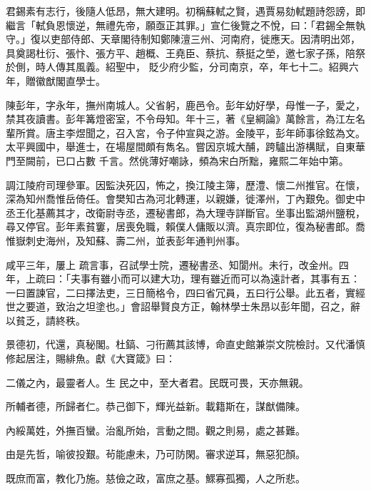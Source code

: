 \begin{pinyinscope}
 君錫素有志行，後隨人低昂，無大建明。初稱蘇軾之賢，遇賈易劾軾題詩怨謗，即繼言「軾負恩懷逆，無禮先帝，願亟正其罪。」宣仁後覽之不悅，曰：「君錫全無執守。」復以吏部侍郎、天章閣待制知鄭陳澶三州、河南府，徙應天。因清明出郊，具奠謁杜衍、張忭、張方平、趙概、王堯臣、蔡抗、蔡挺之塋，邀七家子孫，陪祭於側，時人傳其風義。紹聖中，
 貶少府少監，分司南京，卒，年七十二。紹興六年，贈徽猷閣直學士。



 陳彭年，字永年，撫州南城人。父省躬，鹿邑令。彭年幼好學，母惟一子，愛之，禁其夜讀書。彭年篝燈密室，不令母知。年十三，著《皇綱論》萬餘言，為江左名輩所賞。唐主李煜聞之，召入宮，令子仲宣與之游。金陵平，彭年師事徐鉉為文。太平興國中，舉進士，在場屋間頗有雋名。嘗因京城大酺，跨驢出游構賦，自東華門至闕前，已口占數
 千言。然佻薄好嘲詠，頻為宋白所黜，雍熙二年始中第。



 調江陵府司理參軍。因監決死囚，怖之，換江陵主簿，歷澧、懷二州推官。在懷，深為知州喬惟岳倚任。會樊知古為河北轉運，以親嫌，徙澤州，丁內艱免。御史中丞王化基薦其才，改衛尉寺丞，遷秘書郎，為大理寺詳斷官。坐事出監湖州鹽稅，尋又停官。彭年素貧窶，居喪免職，賴僕人傭販以濟。真宗即位，復為秘書郎。喬惟嶽刺史海州，及知蘇、壽二州，並表彭年通判州事。



 咸平三年，屢上
 疏言事，召試學士院，遷秘書丞、知閬州。未行，改金州。四年，上疏曰：「夫事有雖小而可以建大功，理有雖近而可以為遠計者，其事有五：一曰置諫官，二曰擇法吏，三日簡格令，四曰省冗員，五曰行公舉。此五者，實經世之要道，致治之坦塗也。」會詔舉賢良方正，翰林學士朱昂以彭年聞，召之，辭以貧乏，請終秩。



 景德初，代還，真秘閣。杜鎬、刁衎薦其該博，命直史館兼崇文院檢討。又代潘慎修起居注，賜緋魚。獻《大寶箴》曰：



 二儀之內，最靈者人。生
 民之中，至大者君。民既可畏，天亦無親。



 所輔者德，所歸者仁。恭己御下，輝光益新。載籍斯在，謀猷備陳。



 內綏萬姓，外撫百蠻。治亂所始，言動之間。觀之則易，處之甚難。



 由是先哲，喻彼投艱。茍能慮未，乃可防閑。審求逆耳，無惡犯顏。



 既庶而富，教化乃施。慈儉之政，富庶之基。鰥寡孤獨，人之所悲。




\end{pinyinscope}
